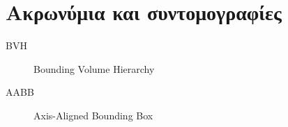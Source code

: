\chapter{Ακρωνύμια και συντομογραφίες}

\begin{description}
  \item[BVH] Bounding Volume Hierarchy
  \item[AABB] Axis-Aligned Bounding Box
\end{description}
